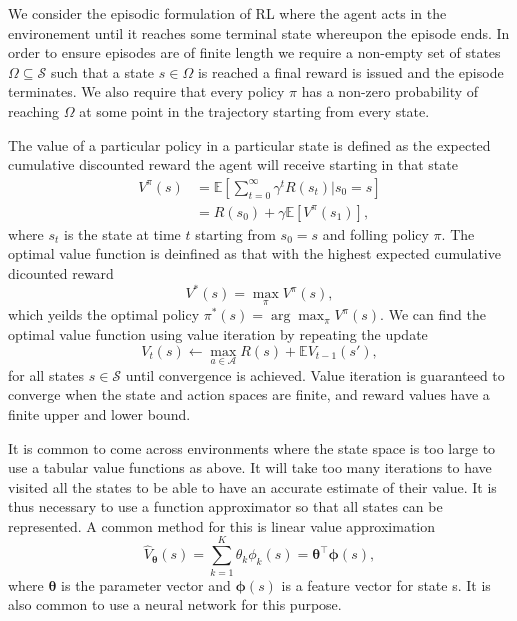 We consider the episodic formulation of RL where the agent acts in the environement until it reaches some terminal state whereupon the episode ends.
In order to ensure episodes are of finite length we require a non-empty set of states $\Omega \subseteq \mathcal{S}$ such that a state $s \in \Omega$ is reached a final reward is issued and the episode terminates.
We also require that every policy $\pi$ has a non-zero probability of reaching $\Omega$ at some point in the trajectory starting from every state.


The value of a particular policy in a particular state is defined as the  expected cumulative discounted reward the agent will receive starting in that state
\begin{align*}
        V^\pi(s) &= \mathbb{E} [ \sum_{t=0}^\infty \gamma^t R(s_t)|s_0=s] \\
        &= R(s_0) + \gamma \mathbb{E} [V^\pi(s_1)],
\end{align*}
where $s_t$ is the state at time $t$ starting from $s_0=s$ and folling policy $\pi$. The optimal value function is deinfined as that with the highest expected cumulative dicounted reward 
\begin{equation*}
    V^*(s) = \max_\pi V^\pi(s),
\end{equation*}
which yeilds the optimal policy $\pi^*(s) = \arg \max_\pi V^\pi(s)$. 
We can find the optimal value function using value iteration by repeating the update
\begin{equation*}
    V_t(s) \leftarrow \max_{a \in \mathcal{A}} R(s) + \mathbb{E} V_{t-1}(s'),
\end{equation*}
for all states $s \in \mathcal{S}$ until convergence is achieved.
Value iteration is guaranteed to converge when the state and action spaces are finite, and reward values have a finite upper and lower bound.

It is common to come across environments where the state space is too large to use a tabular value functions as above. It will take too many iterations to have visited all the states to be able to have an accurate estimate of their value. It is thus necessary to use a function approximator so that all states can be represented. A common method for this is linear value approximation
\begin{equation*}
    \hat{V}_{\boldsymbol{\theta}}(s) = \sum_{k=1}^K \theta_k \phi_k(s) = \boldsymbol{\theta}^\top \boldsymbol{\phi}(s),
\end{equation*}
where $\boldsymbol{\theta}$ is the parameter vector and $\boldsymbol{\phi}(s)$ is a feature vector for state s. It is also common to use a neural network for this purpose.

